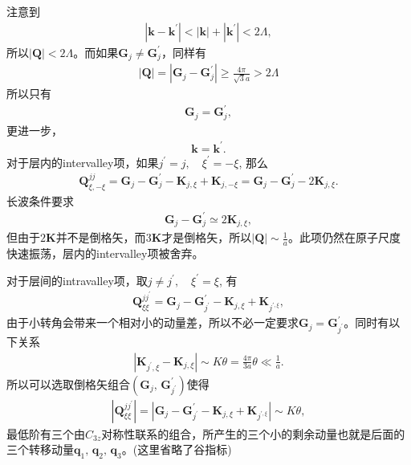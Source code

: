 \documentclass[10pt, oneside]{article}
\begin{document}
注意到
\begin{align}
	\left|\bm{k} - \bm{k}^{\prime}\right| < \left|\bm{k}\right| + \left|\bm{k}^{\prime}\right| < 2 \Lambda,
\end{align}
所以\(\left|\bm{Q}\right| < 2 \Lambda\)。而如果\(\bm{G}_{j} \neq \bm{G}^{\prime}_{j}\)，同样有
\begin{align}
	\left|\bm{Q}\right| = \left|\bm{G}_{j} - \bm{G}^{\prime}_{j}\right| \geq \frac{4 \pi}{\sqrt{3}a} > 2 \Lambda
\end{align}
所以只有
\begin{align}
	\bm{G}_{j} = \bm{G}^{\prime}_{j},
\end{align}
更进一步，
\begin{align}
	\bm{k} = \bm{k}^{\prime}.
\end{align}
对于层内的intervalley项，如果\(j^{\prime} = j, \quad \xi^{\prime} = - \xi\), 那么
\begin{align}
	\bm{Q}^{jj}_{\xi,-\xi} = \bm{G}_{j} - \bm{G}^{\prime}_{j} - \bm{K}_{j, \xi} + \bm{K}_{j, -\xi} = \bm{G}_{j} - \bm{G}^{\prime}_{j} - 2 \bm{K}_{j, \xi}.
\end{align}
长波条件要求
\begin{align}
	\bm{G}_{j} - \bm{G}^{\prime}_{j} \simeq 2 \bm{K}_{j, \xi},
\end{align}
但由于\(2 \bm{K}\)并不是倒格矢，而\(3 \bm{K}\)才是倒格矢，所以\(\left|\bm{Q}\right| \sim \frac{1}{a}\)。此项仍然在原子尺度快速振荡，层内的intervalley项被舍弃。

对于层间的intravalley项，取\(j \neq j^{\prime}, \quad \xi^{\prime} = \xi\), 有
\begin{align}
	\bm{Q}^{jj^{\prime}}_{\xi \xi} = \bm{G}_{j} - \bm{G}^{\prime}_{j^{\prime}} - \bm{K}_{j,\xi} + \bm{K}_{j^{\prime,\xi}},
\end{align}
由于小转角会带来一个相对小的动量差，所以不必一定要求\(\bm{G}_{j} = \bm{G}^{\prime}_{j^{\prime}}\)。同时有以下关系
\begin{align}
	\left|\bm{K}_{j^{\prime},\xi} - \bm{K}_{j,\xi}\right| \sim K \theta = \frac{4 \pi}{3 a} \theta \ll \frac{1}{a}.
\end{align}
所以可以选取倒格矢组合\(\left( \bm{G}_{j},\, \bm{G}^{\prime}_{j^{\prime}}\right)\)使得
\begin{align}
	\left|\bm{Q}^{jj^{\prime}}_{\xi \xi}\right| = \left|\bm{G}_{j} - \bm{G}^{\prime}_{j^{\prime}} - \bm{K}_{j,\xi} + \bm{K}_{j^{\prime,\xi}}\right| \sim K \theta ,
\end{align}
最低阶有三个由\(C_{3z}\)对称性联系的组合，所产生的三个小的剩余动量也就是后面的三个转移动量\(\bm{q}_{1},\,\bm{q}_{2},\, \bm{q}_{3}\)。(这里省略了谷指标)
\end{document}
